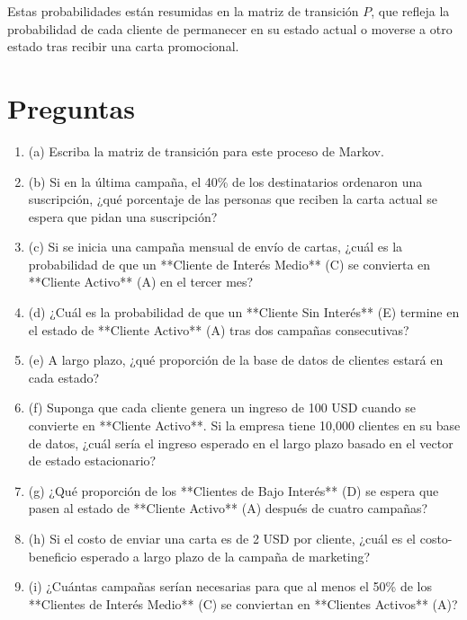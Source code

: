 \documentclass{article}
\begin{document}
Estas probabilidades están resumidas en la matriz de transición \( P \), que refleja la probabilidad de cada cliente de permanecer en su estado actual o moverse a otro estado tras recibir una carta promocional.

\section*{Preguntas}

\begin{enumerate}
    \item (a) Escriba la matriz de transición para este proceso de Markov.
    
    \item (b) Si en la última campaña, el 40\% de los destinatarios ordenaron una suscripción, ¿qué porcentaje de las personas que reciben la carta actual se espera que pidan una suscripción?

    \item (c) Si se inicia una campaña mensual de envío de cartas, ¿cuál es la probabilidad de que un **Cliente de Interés Medio** (C) se convierta en **Cliente Activo** (A) en el tercer mes?

    \item (d) ¿Cuál es la probabilidad de que un **Cliente Sin Interés** (E) termine en el estado de **Cliente Activo** (A) tras dos campañas consecutivas?

    \item (e) A largo plazo, ¿qué proporción de la base de datos de clientes estará en cada estado?

    \item (f) Suponga que cada cliente genera un ingreso de 100 USD cuando se convierte en **Cliente Activo**. Si la empresa tiene 10,000 clientes en su base de datos, ¿cuál sería el ingreso esperado en el largo plazo basado en el vector de estado estacionario?

    \item (g) ¿Qué proporción de los **Clientes de Bajo Interés** (D) se espera que pasen al estado de **Cliente Activo** (A) después de cuatro campañas?

    \item (h) Si el costo de enviar una carta es de 2 USD por cliente, ¿cuál es el costo-beneficio esperado a largo plazo de la campaña de marketing?

    \item (i) ¿Cuántas campañas serían necesarias para que al menos el 50\% de los **Clientes de Interés Medio** (C) se conviertan en **Clientes Activos** (A)?
\end{enumerate}
\end{document}
